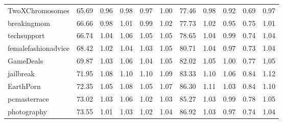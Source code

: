 \begin{tabular}{lrrrrrrrrrr}
TwoXChromosomes     &          65.69 &                0.96 &                0.98 &                0.97 &                1.00 &                 77.46 &                       0.98 &                       0.92 &                       0.69 &                       0.97 \\
breakingmom         &          66.66 &                0.98 &                1.01 &                0.99 &                1.02 &                 77.73 &                       1.02 &                       0.95 &                       0.75 &                       1.01 \\
techsupport         &          66.74 &                1.04 &                1.06 &                1.05 &                1.05 &                 78.65 &                       1.04 &                       0.99 &                       0.74 &                       1.04 \\
femalefashionadvice &          68.42 &                1.02 &                1.04 &                1.03 &                1.05 &                 80.71 &                       1.04 &                       0.97 &                       0.73 &                       1.04 \\
GameDeals           &          69.87 &                1.03 &                1.06 &                1.04 &                1.05 &                 82.02 &                       1.05 &                       1.00 &                       0.77 &                       1.05 \\
jailbreak           &          71.95 &                1.08 &                1.10 &                1.10 &                1.09 &                 83.33 &                       1.10 &                       1.06 &                       0.84 &                       1.12 \\
EarthPorn           &          72.35 &                1.05 &                1.08 &                1.05 &                1.07 &                 86.30 &                       1.11 &                       1.03 &                       0.84 &                       1.10 \\
pcmasterrace        &          73.02 &                1.03 &                1.06 &                1.02 &                1.03 &                 85.27 &                       1.03 &                       0.99 &                       0.78 &                       1.05 \\
photography         &          73.55 &                1.01 &                1.03 &                1.02 &                1.04 &                 86.92 &                       1.03 &                       0.97 &                       0.74 &                       1.04 \\

\end{tabular}
